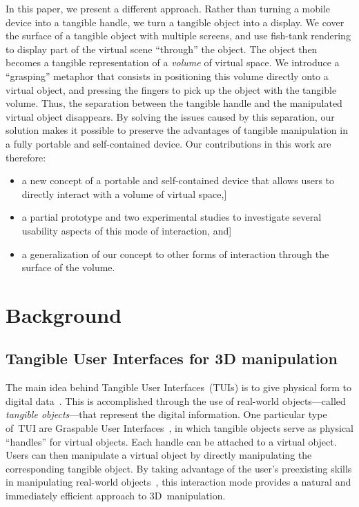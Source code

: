 \documentclass{vgtc}                         \havecopyrightspacefalse
\begin{document}
In this paper, we present a different approach. Rather than turning a mobile device into a tangible handle, we turn a tangible object into a display. We cover the surface of a tangible object with multiple screens, and use fish-tank rendering to display part of the virtual scene ``through'' the object. The object then becomes a tangible representation of a \emph{volume} of virtual space. We introduce a ``grasping'' metaphor that consists in positioning this volume directly onto a virtual object, and pressing the fingers to pick up the object with the tangible volume. Thus, the separation between the tangible handle and the manipulated virtual object disappears. By solving the issues caused by this separation, our solution makes it possible to preserve the advantages of tangible manipulation in a fully portable and self-contained device. Our contributions in this work are therefore:
\begin{itemize}[noitemsep,topsep=1mm]
\item a new concept of a portable and self-contained device that allows users to directly interact with a volume of virtual space,\-2.7mm]
\item a partial prototype and two experimental studies to investigate several usability aspects of this mode of interaction, and\-2.7mm]
\item a generalization of our concept to other forms of interaction through the surface of the volume.
\end{itemize}

\section{Background}

\subsection{Tangible User Interfaces for 3D manipulation}

The main idea behind Tangible User Interfaces~(TUIs) is to give physical form to digital data~\cite{ishii08,ishii97}. This is accomplished through the use of real-world objects---called \emph{tangible objects}---that represent the digital information. One particular type of~TUI are Graspable User Interfaces~\cite{fitzmaurice96}, in which tangible objects serve as physical ``handles'' for virtual objects. Each handle can be attached to a virtual object. Users can then manipulate a virtual object by directly manipulating the corresponding tangible object. By taking advantage of the user's preexisting skills in manipulating real-world objects~\mbox{\cite{fitzmaurice96,ishii08}}, this interaction mode provides a natural and immediately efficient approach to 3D~manipulation.
\end{document}
